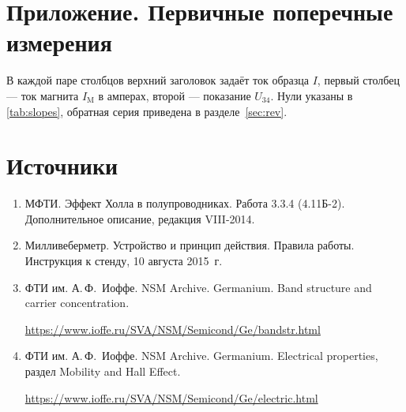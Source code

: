 \documentclass[a4paper,12pt]{article}
\newcommand{\im}{I_{\mathrm M}}
\begin{document}
\clearpage
\section*{Приложение. Первичные поперечные измерения}
В каждой паре столбцов верхний заголовок задаёт ток образца $I$, первый столбец — ток магнита $\im$ в амперах, второй — показание $U_{34}$. Нули указаны в \cref{tab:slopes}, обратная серия приведена в разделе~\ref{sec:rev}.


\section*{Источники}
\raggedright
\begin{enumerate}
\item МФТИ. Эффект Холла в полупроводниках. Работа 3.3.4 (4.11Б-2). Дополнительное описание, редакция VIII-2014.
\item Милливеберметр. Устройство и принцип действия. Правила работы. Инструкция к стенду, 10 августа 2015~г.
\item ФТИ им. А.\,Ф.~Иоффе. NSM Archive. Germanium. Band structure and carrier concentration.\par{\small\url{https://www.ioffe.ru/SVA/NSM/Semicond/Ge/bandstr.html}}
\item ФТИ им. А.\,Ф.~Иоффе. NSM Archive. Germanium. Electrical properties, раздел Mobility and Hall Effect.\par{\small\url{https://www.ioffe.ru/SVA/NSM/Semicond/Ge/electric.html}}
\end{enumerate}
\end{document}
